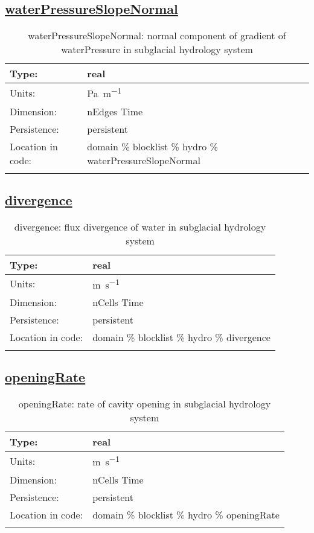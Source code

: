 \subsection[waterPressureSlopeNormal]{\hyperref[sec:var_tab_hydro]{waterPressureSlopeNormal}}
\label{subsec:var_sec_hydro_waterPressureSlopeNormal}
\begin{center}
\begin{longtable}{| p{2.0in} | p{4.0in} |}
        \hline 
        Type: & real \\
        \hline 
        Units: & \si{Pa.m^{-1}} \\
        \hline 
        Dimension: & nEdges Time \\
        \hline 
        Persistence: & persistent \\
        \hline 
         Location in code: & domain \% blocklist \% hydro \% waterPressureSlopeNormal \\
         \hline 
    \caption{waterPressureSlopeNormal: normal component of gradient of waterPressure in subglacial hydrology system}
\end{longtable}
\end{center}
\subsection[divergence]{\hyperref[sec:var_tab_hydro]{divergence}}
\label{subsec:var_sec_hydro_divergence}
\begin{center}
\begin{longtable}{| p{2.0in} | p{4.0in} |}
        \hline 
        Type: & real \\
        \hline 
        Units: & \si{m.s^{-1}} \\
        \hline 
        Dimension: & nCells Time \\
        \hline 
        Persistence: & persistent \\
        \hline 
         Location in code: & domain \% blocklist \% hydro \% divergence \\
         \hline 
    \caption{divergence: flux divergence of water in subglacial hydrology system}
\end{longtable}
\end{center}
\subsection[openingRate]{\hyperref[sec:var_tab_hydro]{openingRate}}
\label{subsec:var_sec_hydro_openingRate}
\begin{center}
\begin{longtable}{| p{2.0in} | p{4.0in} |}
        \hline 
        Type: & real \\
        \hline 
        Units: & \si{m.s^{-1}} \\
        \hline 
        Dimension: & nCells Time \\
        \hline 
        Persistence: & persistent \\
        \hline 
         Location in code: & domain \% blocklist \% hydro \% openingRate \\
         \hline 
    \caption{openingRate: rate of cavity opening in subglacial hydrology system}
\end{longtable}
\end{center}
